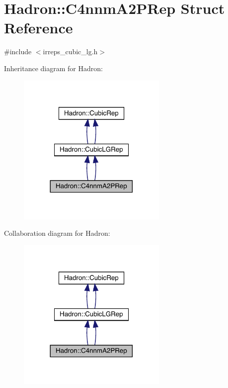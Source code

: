 \hypertarget{structHadron_1_1C4nnmA2PRep}{}\section{Hadron\+:\+:C4nnm\+A2\+P\+Rep Struct Reference}
\label{structHadron_1_1C4nnmA2PRep}


{\ttfamily \#include $<$irreps\+\_\+cubic\+\_\+lg.\+h$>$}



Inheritance diagram for Hadron\+:\nopagebreak
\begin{figure}[H]
\begin{center}
\leavevmode
\includegraphics[width=204pt]{d2/d94/structHadron_1_1C4nnmA2PRep__inherit__graph}
\end{center}
\end{figure}


Collaboration diagram for Hadron\+:\nopagebreak
\begin{figure}[H]
\begin{center}
\leavevmode
\includegraphics[width=204pt]{df/d92/structHadron_1_1C4nnmA2PRep__coll__graph}
\end{center}
\end{figure}
